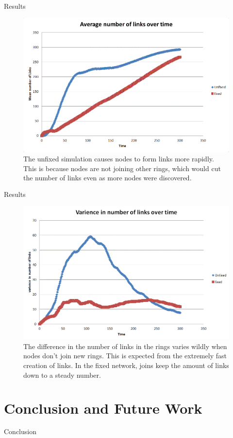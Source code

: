 \documentclass{beamer}
\begin{document}
\begin{frame}{Results}
\begin{figure}
	\includegraphics[scale=0.2]{chart1}
	\caption{The unfixed simulation causes nodes to form links more rapidly.  This is because nodes are not joining other rings, which would cut the number of links even as more nodes were discovered.}
	\label{chart1}
\end{figure}

\end{frame}


\begin{frame}{Results}

\begin{figure}
	\includegraphics[width=0.7\linewidth]{chart2}
	\caption{The difference in the number of links in the rings varies wildly when nodes don't join new rings. This is expected from the extremely fast creation of links.  In the fixed network, joins keep the amount of links down to a steady number. }
	\label{chart2}
\end{figure}

\end{frame}

\section{Conclusion and Future Work}

\begin{frame}{Conclusion}

\end{frame}
\end{document}
